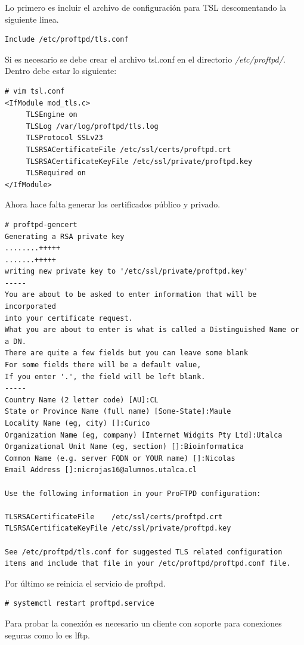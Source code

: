 \documentclass[12pt]{article}
\begin{document}
Lo primero es incluir el archivo de configuración para TSL descomentando la siguiente linea.
\begin{lstlisting}[frame=single]
Include /etc/proftpd/tls.conf
\end{lstlisting}

Si es necesario se debe crear el archivo tsl.conf en el directorio \emph{/etc/proftpd/}. Dentro debe estar lo siguiente:
\begin{lstlisting}[frame=single]
# vim tsl.conf
<IfModule mod_tls.c>
     TLSEngine on
     TLSLog /var/log/proftpd/tls.log
     TLSProtocol SSLv23
     TLSRSACertificateFile /etc/ssl/certs/proftpd.crt
     TLSRSACertificateKeyFile /etc/ssl/private/proftpd.key
     TLSRequired on
</IfModule>
\end{lstlisting}
\break
\break
\break
\break
Ahora hace falta generar los certificados público y privado.
\begin{lstlisting}[frame=single]
# proftpd-gencert
Generating a RSA private key
........+++++
.......+++++
writing new private key to '/etc/ssl/private/proftpd.key'
-----
You are about to be asked to enter information that will be incorporated
into your certificate request.
What you are about to enter is what is called a Distinguished Name or a DN.
There are quite a few fields but you can leave some blank
For some fields there will be a default value,
If you enter '.', the field will be left blank.
-----
Country Name (2 letter code) [AU]:CL
State or Province Name (full name) [Some-State]:Maule
Locality Name (eg, city) []:Curico
Organization Name (eg, company) [Internet Widgits Pty Ltd]:Utalca
Organizational Unit Name (eg, section) []:Bioinformatica
Common Name (e.g. server FQDN or YOUR name) []:Nicolas
Email Address []:nicrojas16@alumnos.utalca.cl

Use the following information in your ProFTPD configuration:

TLSRSACertificateFile    /etc/ssl/certs/proftpd.crt
TLSRSACertificateKeyFile /etc/ssl/private/proftpd.key

See /etc/proftpd/tls.conf for suggested TLS related configuration
items and include that file in your /etc/proftpd/proftpd.conf file.
\end{lstlisting}

Por último se reinicia el servicio de proftpd.
\begin{lstlisting}[frame=single]
# systemctl restart proftpd.service
\end{lstlisting}

Para probar la conexión es necesario un cliente con soporte para conexiones seguras como lo es lftp.
\end{document}

